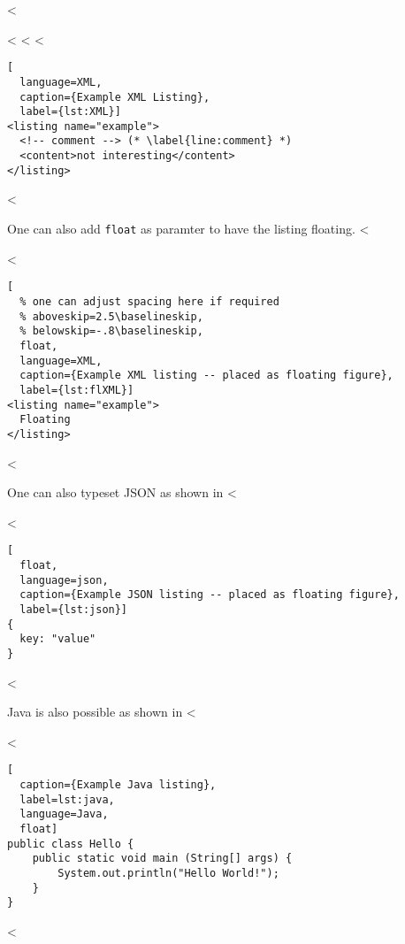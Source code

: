 <%

<%
<%
<%

\begin{lstlisting}[
  language=XML,
  caption={Example XML Listing},
  label={lst:XML}]
<listing name="example">
  <!-- comment --> (* \label{line:comment} *)
  <content>not interesting</content>
</listing>
\end{lstlisting}
<%

One can also add \verb+float+ as paramter to have the listing floating.
<%

<%
\begin{lstlisting}[
  % one can adjust spacing here if required
  % aboveskip=2.5\baselineskip,
  % belowskip=-.8\baselineskip,
  float,
  language=XML,
  caption={Example XML listing -- placed as floating figure},
  label={lst:flXML}]
<listing name="example">
  Floating
</listing>
\end{lstlisting}
<%

One can also typeset JSON as shown in <%

<%
\begin{lstlisting}[
  float,
  language=json,
  caption={Example JSON listing -- placed as floating figure},
  label={lst:json}]
{
  key: "value"
}
\end{lstlisting}
<%

Java is also possible as shown in <%

<%
\begin{lstlisting}[
  caption={Example Java listing},
  label=lst:java,
  language=Java,
  float]
public class Hello {
    public static void main (String[] args) {
        System.out.println("Hello World!");
    }
}
\end{lstlisting}
<%

